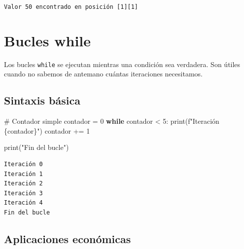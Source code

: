\documentclass[
  doc,
  floatsintext,
  longtable,
  a4paper,
  nolmodern,
  notxfonts,
  notimes,
  12pt,
  colorlinks=true,linkcolor=blue,citecolor=blue,urlcolor=blue]{apa7}
\newenvironment{Shaded}{\begin{snugshade}}{\end{snugshade}}
\newcommand{\BuiltInTok}[1]{\textcolor[rgb]{0.00,0.23,0.31}{#1}}
\newcommand{\CommentTok}[1]{\textcolor[rgb]{0.37,0.37,0.37}{#1}}
\newcommand{\ControlFlowTok}[1]{\textcolor[rgb]{0.00,0.23,0.31}{\textbf{#1}}}
\newcommand{\DecValTok}[1]{\textcolor[rgb]{0.68,0.00,0.00}{#1}}
\newcommand{\NormalTok}[1]{\textcolor[rgb]{0.00,0.23,0.31}{#1}}
\newcommand{\OperatorTok}[1]{\textcolor[rgb]{0.37,0.37,0.37}{#1}}
\newcommand{\SpecialCharTok}[1]{\textcolor[rgb]{0.37,0.37,0.37}{#1}}
\newcommand{\SpecialStringTok}[1]{\textcolor[rgb]{0.13,0.47,0.30}{#1}}
\newcommand{\StringTok}[1]{\textcolor[rgb]{0.13,0.47,0.30}{#1}}
\begin{document}
\begin{verbatim}
Valor 50 encontrado en posición [1][1]
\end{verbatim}

\section{Bucles while}\label{bucles-while}

Los bucles \texttt{while} se ejecutan mientras una condición sea
verdadera. Son útiles cuando no sabemos de antemano cuántas iteraciones
necesitamos.

\subsection{Sintaxis básica}\label{sintaxis-buxe1sica-1}

\begin{Shaded}
\begin{Highlighting}[]
\CommentTok{\# Contador simple}
\NormalTok{contador }\OperatorTok{=} \DecValTok{0}
\ControlFlowTok{while}\NormalTok{ contador }\OperatorTok{\textless{}} \DecValTok{5}\NormalTok{:}
    \BuiltInTok{print}\NormalTok{(}\SpecialStringTok{f"Iteración }\SpecialCharTok{\{}\NormalTok{contador}\SpecialCharTok{\}}\SpecialStringTok{"}\NormalTok{)}
\NormalTok{    contador }\OperatorTok{+=} \DecValTok{1}

\BuiltInTok{print}\NormalTok{(}\StringTok{"Fin del bucle"}\NormalTok{)}
\end{Highlighting}
\end{Shaded}

\begin{verbatim}
Iteración 0
Iteración 1
Iteración 2
Iteración 3
Iteración 4
Fin del bucle
\end{verbatim}

\subsection{Aplicaciones económicas}\label{aplicaciones-econuxf3micas-4}
\end{document}

